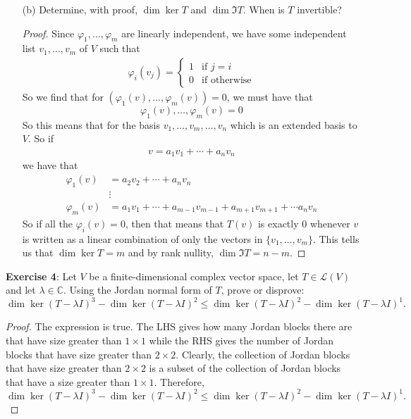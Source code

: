 \documentclass{article}
\begin{document}
\begin{enumerate}
	\item [(b)] Determine, with proof, $\dim{\ker{T}}$ and $\dim{\Im{T}}$. When is $T$ invertible?
		\begin{proof}
			Since $\varphi_{1}, \ldots, \varphi_{m}$ are linearly independent, we have some independent list $v_{1}, \ldots, v_{m}$ of $V$ such that
			\begin{align*}
				\varphi_{i}(v_{j}) = \begin{cases}
					1 & \text{if $j = i$} \\
					0 & \text{if otherwise}
				\end{cases}
			\end{align*}
			So we find that for $(\varphi_{1}(v), \ldots, \varphi_{m}(v)) = 0$, we must have that 
			\begin{equation*}
				\varphi_{1}(v), \ldots, \varphi_{m}(v) = 0
			\end{equation*}	
			So this means that for the basis $v_{1}, \ldots, v_{m}, \ldots, v_{n}$ which is an extended basis to $V$. So if 
			\begin{align*}
				v = a_{1}v_{1} + \cdots + a_{n}v_{n}
			\end{align*}
			we have that 
			\begin{align*}
				\varphi_{1}(v) &= a_{2}v_{2} + \cdots + a_{n}v_{n} \\
					       &\vdots \\
				\varphi_{m}(v) &= a_{1}v_{1} + \cdots + a_{m - 1}v_{m - 1} + a_{m + 1}v_{m + 1} + \cdots a_{n}v_{n}
			\end{align*}
			So if all the $\varphi_{i}(v) = 0$, then that means that $T(v)$ is exactly 0 whenever $v$ is written as a linear combination of only the vectors in $\{v_{1}, \ldots, v_{m}\}$. This tells us that $\dim{\ker{T}} = m$ and by rank nullity, $\dim{\Im{T}} = n - m$.
		\end{proof}
\end{enumerate}
\textbf{Exercise 4}: Let $V$ be a finite-dimensional complex vector space, let $T \in \mathcal{L}(V)$ and let $\lambda \in \mathbb{C}$. Using the Jordan normal form of $T$, prove or disprove:
\begin{equation*}
	\dim{\ker{(T - \lambda I)^{3}}} - \dim{\ker{(T - \lambda I)^{2}}} \leq \dim{\ker{(T - \lambda I)^{2}}} - \dim{\ker{(T - \lambda I)^{1}}}.
\end{equation*}
\begin{proof}
	The expression is true. The LHS gives how many Jordan blocks there are that have size greater than $1 \times 1$ while the RHS gives the number of Jordan blocks that have size greater than $2 \times 2$. Clearly, the collection of Jordan blocks that have size greater than $2 \times 2$ is a subset of the collection of Jordan blocks that have a size greater than $1 \times 1$. Therefore, 
	\begin{equation*}
		\dim{\ker{(T - \lambda I)^{3}}} - \dim{\ker{(T - \lambda I)^{2}}} \leq \dim{\ker{(T - \lambda I)^{2}}} - \dim{\ker{(T - \lambda I)^{1}}}.
	\end{equation*}
\end{proof}
\end{document}
